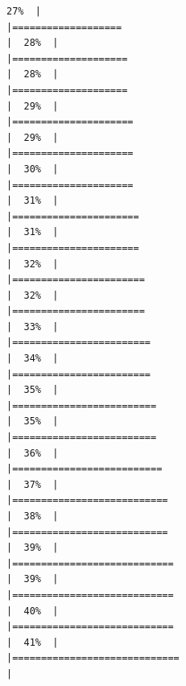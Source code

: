 \documentclass[
  english,
  man,a4paper,mask,floatsintext]{apa6}
\begin{document}
\begin{verbatim}
27%  |                                                                              |===================                                                   |  28%  |                                                                              |====================                                                  |  28%  |                                                                              |====================                                                  |  29%  |                                                                              |=====================                                                 |  29%  |                                                                              |=====================                                                 |  30%  |                                                                              |=====================                                                 |  31%  |                                                                              |======================                                                |  31%  |                                                                              |======================                                                |  32%  |                                                                              |=======================                                               |  32%  |                                                                              |=======================                                               |  33%  |                                                                              |========================                                              |  34%  |                                                                              |========================                                              |  35%  |                                                                              |=========================                                             |  35%  |                                                                              |=========================                                             |  36%  |                                                                              |==========================                                            |  37%  |                                                                              |===========================                                           |  38%  |                                                                              |===========================                                           |  39%  |                                                                              |============================                                          |  39%  |                                                                              |============================                                          |  40%  |                                                                              |============================                                          |  41%  |                                                                              |=============================                                         |  
\end{verbatim}
\end{document}
